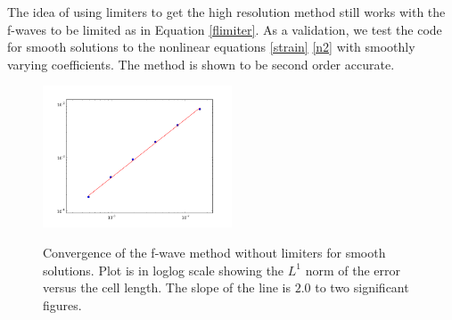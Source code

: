 \documentclass{article}
\begin{document}
\noindent The idea of using limiters to get the high resolution method still works with the f-waves to be limited as in Equation \eqref{flimiter}. As a validation, we test the code for smooth solutions to the nonlinear equations \eqref{strain} \eqref{n2} with smoothly varying coefficients. The method is shown to be second order accurate.
\begin{figure}
  \centering
  \includegraphics[width=0.5\textwidth]{loglog_error.png}\\
  \caption{Convergence of the f-wave method without limiters for smooth solutions. Plot is in loglog scale showing the $L^1$ norm of the error versus the cell length. The slope of the line is $2.0$ to two significant figures.}\label{convtest}
\end{figure}
\end{document}

